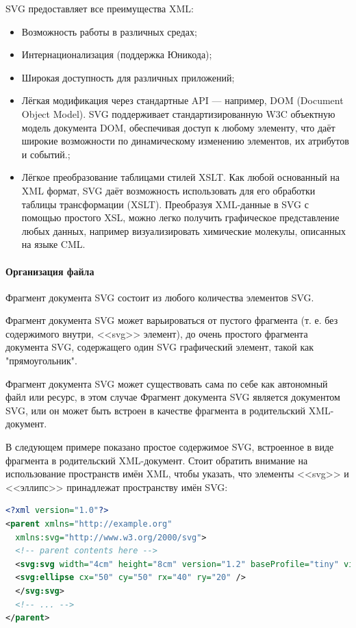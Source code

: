 SVG предоставляет все преимущества XML:
\begin{itemize}
	\item Возможность работы в различных средах;
	\item Интернационализация (поддержка Юникода);
	\item Широкая доступность для различных приложений;
	\item Лёгкая модификация через стандартные API — например, DOM (Document Object Model). SVG поддерживает стандартизированную W3C объектную модель документа DOM, обеспечивая доступ к любому элементу, что даёт широкие возможности по динамическому изменению элементов, их атрибутов и событий.;
	\item Лёгкое преобразование таблицами стилей XSLT. Как любой основанный на XML формат, SVG даёт возможность использовать для его обработки таблицы трансформации (XSLT). Преобразуя XML-данные в SVG с помощью простого XSL, можно легко получить графическое представление любых данных, например визуализировать химические молекулы, описанных на языке CML.
\end{itemize}

\paragraph{Организация файла}
\nopagebreak

Фрагмент документа SVG состоит из любого количества элементов SVG.

Фрагмент документа SVG может варьироваться от пустого фрагмента (т. е. без содержимого внутри, <<svg>> элемент), до очень простого фрагмента документа SVG, содержащего один SVG графический элемент, такой как "прямоугольник".

Фрагмент документа SVG может существовать сама по себе как автономный файл или ресурс, в этом случае Фрагмент документа SVG является документом SVG, или он может быть встроен в качестве фрагмента в родительский XML-документ.

В следующем примере показано простое содержимое SVG, встроенное в виде фрагмента в родительский XML-документ. Стоит обратить внимание на использование пространств имён XML, чтобы указать, что элементы <<svg>> и <<эллипс>> принадлежат пространству имён SVG:
\begin{lstlisting}[language=XML,label=list:xml]
<?xml version="1.0"?>
<parent xmlns="http://example.org"
  xmlns:svg="http://www.w3.org/2000/svg">
  <!-- parent contents here -->
  <svg:svg width="4cm" height="8cm" version="1.2" baseProfile="tiny" viewBox="0 0 100 100">
  <svg:ellipse cx="50" cy="50" rx="40" ry="20" />
  </svg:svg>
  <!-- ... -->
</parent>
\end{lstlisting}

